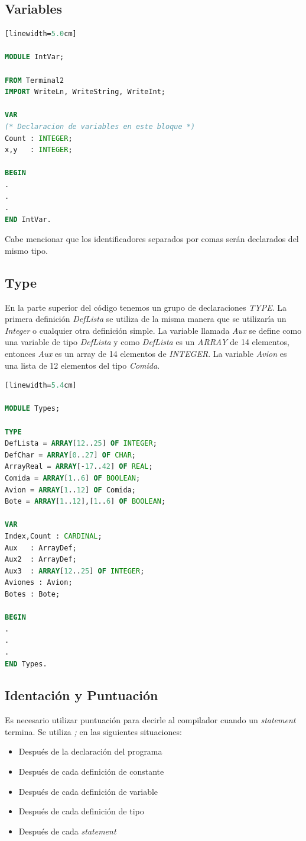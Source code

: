 \documentclass[10pt,journal,compsoc]{IEEEtran}
\begin{document}
\subsection{Variables}
\begin{lstlisting}[language=Modula-2, caption = {Declaraci\'on de Variables}][linewidth=5.0cm]

MODULE IntVar;

FROM Terminal2 
IMPORT WriteLn, WriteString, WriteInt;

VAR 
(* Declaracion de variables en este bloque *)
Count : INTEGER; 
x,y   : INTEGER;  

BEGIN
.
.
.
END IntVar.
\end{lstlisting}
Cabe mencionar que los identificadores separados por comas ser\'an declarados del mismo tipo.

\subsection{Type}
En la parte superior del c\'odigo tenemos un grupo de declaraciones \emph{TYPE}. La primera definici\'on \emph{DefLista} se utiliza de la misma manera que se utilizar\'ia un \emph{Integer} o cualquier otra definici\'on simple. La variable llamada \emph{Aux} se define como una variable de tipo \emph{DefLista} y como \emph{DefLista} es un \emph{ARRAY} de 14 elementos, entonces \emph{Aux} es un array de 14 elementos de \emph{INTEGER}. La variable \emph{Avion} es una lista de 12 elementos del tipo \emph{Comida}.

\begin{lstlisting}[language=Modula-2, caption = {C\'odigo de declaraci\'on para un tipo}][linewidth=5.4cm]

MODULE Types;

TYPE  
DefLista = ARRAY[12..25] OF INTEGER;
DefChar = ARRAY[0..27] OF CHAR;
ArrayReal = ARRAY[-17..42] OF REAL;
Comida = ARRAY[1..6] OF BOOLEAN;
Avion = ARRAY[1..12] OF Comida;
Bote = ARRAY[1..12],[1..6] OF BOOLEAN;

VAR   
Index,Count : CARDINAL;
Aux   : ArrayDef;
Aux2  : ArrayDef;
Aux3  : ARRAY[12..25] OF INTEGER;
Aviones : Avion;
Botes : Bote;

BEGIN
.
.
.
END Types.

\end{lstlisting}

\subsection{Identaci\'on y Puntuaci\'on}
Es necesario utilizar puntuaci\'on para decirle al compilador cuando un \emph{statement} termina. Se utiliza \emph{;} en las siguientes situaciones:
\begin{itemize}
	\item Despu\'es de la declaraci\'on del programa
	\item Despu\'es de cada definici\'on de constante
	\item Despu\'es de cada definici\'on de variable
	\item Despu\'es de cada definici\'on de tipo
	\item Despu\'es de cada \emph{statement}
\end{itemize}
\end{document}
